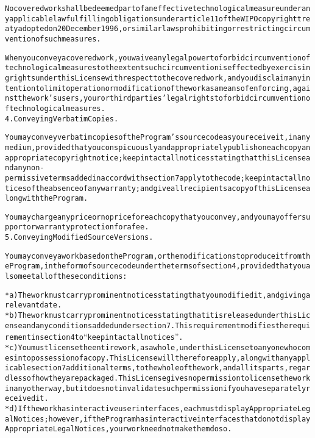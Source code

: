 \begin{alltt}
No covered work shall be deemed part of an effective technological measure under any applicable law fulfilling obligations under article 11 of the WIPO copyright treaty adopted on 20 December 1996, or similar laws prohibiting or restricting circumvention of such measures.

When you convey a covered work, you waive any legal power to forbid circumvention of technological measures to the extent such circumvention is effected by exercising rights under this License with respect to the covered work, and you disclaim any intention to limit operation or modification of the work as a means of enforcing, against the work's users, your or third parties' legal rights to forbid circumvention of technological measures.
4. Conveying Verbatim Copies.

You may convey verbatim copies of the Program's source code as you receive it, in any medium, provided that you conspicuously and appropriately publish on each copy an appropriate copyright notice; keep intact all notices stating that this License and any non-permissive terms added in accord with section 7 apply to the code; keep intact all notices of the absence of any warranty; and give all recipients a copy of this License along with the Program.

You may charge any price or no price for each copy that you convey, and you may offer support or warranty protection for a fee.
5. Conveying Modified Source Versions.

You may convey a work based on the Program, or the modifications to produce it from the Program, in the form of source code under the terms of section 4, provided that you also meet all of these conditions:

    * a) The work must carry prominent notices stating that you modified it, and giving a relevant date.
    * b) The work must carry prominent notices stating that it is released under this License and any conditions added under section 7. This requirement modifies the requirement in section 4 to “keep intact all notices”.
    * c) You must license the entire work, as a whole, under this License to anyone who comes into possession of a copy. This License will therefore apply, along with any applicable section 7 additional terms, to the whole of the work, and all its parts, regardless of how they are packaged. This License gives no permission to license the work in any other way, but it does not invalidate such permission if you have separately received it.
    * d) If the work has interactive user interfaces, each must display Appropriate Legal Notices; however, if the Program has interactive interfaces that do not display Appropriate Legal Notices, your work need not make them do so.


\end{alltt}
